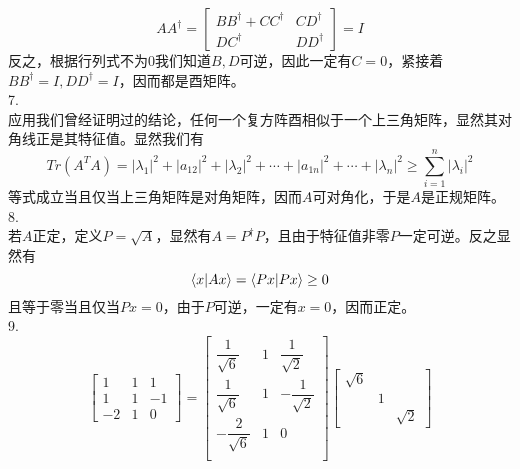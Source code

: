 \documentclass[utf8]{ctexart}
\begin{document}
\[AA^\dagger=\begin{bmatrix}
	BB^\dagger+CC^\dagger&CD^\dagger\\
	DC^\dagger&DD^\dagger
\end{bmatrix}=I\]
反之，根据行列式不为$0$我们知道$B,D$可逆，因此一定有$C=0$，紧接着$BB^\dagger=I,DD^\dagger=I$，因而都是酉矩阵。\\
7.\\
应用我们曾经证明过的结论，任何一个复方阵酉相似于一个上三角矩阵，显然其对角线正是其特征值。显然我们有
\[Tr(A^TA)=|\lambda_1|^2+|a_{12}|^2+|\lambda_2|^2+\cdots+|a_{1n}|^2+\cdots+|\lambda_n|^2\ge\sum_{i=1}^n|\lambda_i|^2\]
等式成立当且仅当上三角矩阵是对角矩阵，因而$A$可对角化，于是$A$是正规矩阵。\\
8.\\
若$A$正定，定义$P=\sqrt{A}$，显然有$A=P^\dagger P$，且由于特征值非零$P$一定可逆。反之显然有
\[\braket{x|Ax}=\braket{Px|Px}\ge0\]
且等于零当且仅当$Px=0$，由于$P$可逆，一定有$x=0$，因而正定。\\
9.\\
\[\begin{bmatrix}
	1&1&1\\
	1&1&-1\\
	-2&1&0
\end{bmatrix}=\begin{bmatrix}
\dfrac{1}{\sqrt{6}}&1&\dfrac{1}{\sqrt{2}}\\[8pt]
\dfrac{1}{\sqrt{6}}&1&-\dfrac{1}{\sqrt{2}}\\[8pt]
-\dfrac{2}{\sqrt{6}}&1&0\\
\end{bmatrix}\begin{bmatrix}
\sqrt{6}&&\\
&1&\\
&&\sqrt{2}
\end{bmatrix}\]
\end{document}
